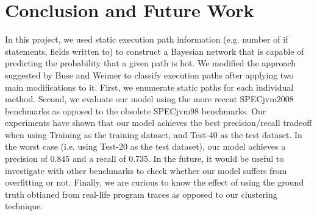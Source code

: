 \documentclass[10pt,twocolumn,letterpaper]{article}
\begin{document}
\section{Conclusion and Future Work}
\label{sec:conc}
In this project, we used static execution path information (e.g. number of if statements, fields written to) to construct a Bayesian network that is
capable of predicting the probability that a given path is hot. We modified the approach suggested by Buse and Weimer \cite{buse2009road} to classify
execution paths after applying two main modifications to it. First, we enumerate static paths for each individual method. Second, we evaluate our model using
the more recent SPECjvm2008 \cite{specjvm2008} benchmarks as opposed to the obsolete SPECjvm98 \cite{specjvm98} benchmarks. Our experiments have shown that our
model achieves the best precision/recall tradeoff when using Training as the training dataset, and Test-40 as the test dataset. In the worst case (i.e. using
Test-20 as the test dataset), our model achieves a precision of 0.845 and a recall of 0.735. In the future, it would be useful to investigate with other
benchmarks to check whether our model suffers from overfitting or not. Finally, we are curious to know the effect of using the ground truth obtianed from
real-life program traces as opposed to our clustering technique.

{\small


}
\end{document}
